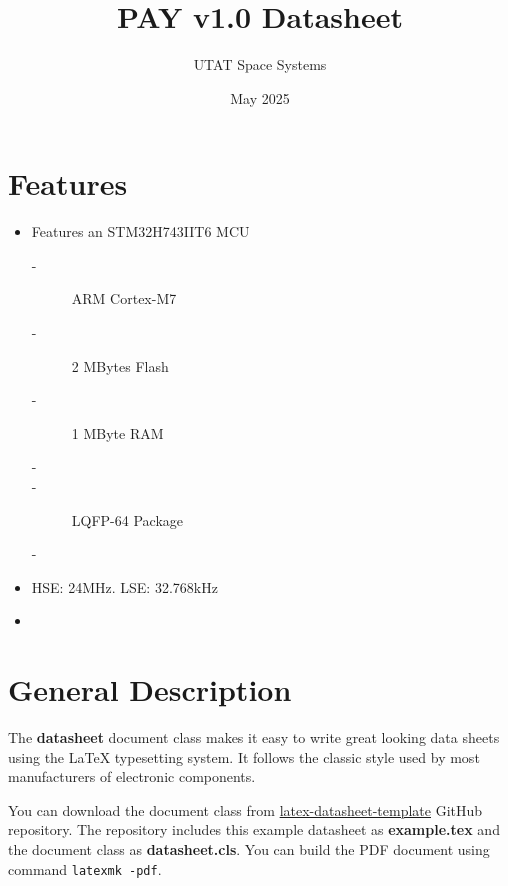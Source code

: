 \documentclass[10pt]{../datasheet}
\title{PAY v1.0 Datasheet}
\author{UTAT Space Systems}
\date{May 2025}
\begin{document}
\maketitle

\section{Features}

\begin{itemize}
  \item{Features an STM32H743IIT6 MCU}
        \begin{description}
          \item[-] ARM Cortex-M7
          \item[-] 2 MBytes Flash
          \item[-] 1 MByte RAM
          \item[-] 
          \item[-] LQFP-64 Package
          \item[-] 
        \end{description}
  \item{HSE: 24MHz. LSE: 32.768kHz}
  \item{}
\end{itemize}



\section{General Description}
The \textbf{datasheet} document class makes it easy to write great looking
data sheets using the LaTeX typesetting system. It follows the classic style used
by most manufacturers of electronic components.

You can download the document class from
\href{https://github.com/PetteriAimonen/latex-datasheet-template/}{latex-datasheet-template}
GitHub repository.
The repository includes this example datasheet as \textbf{example.tex} and
the document class as \textbf{datasheet.cls}.
You can build the PDF document using command \texttt{latexmk -pdf}.

\vfill\break
\end{document}
